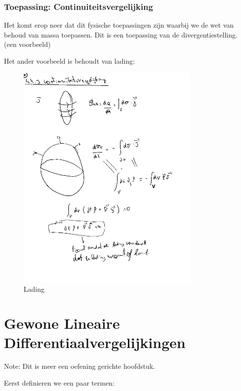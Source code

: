 \documentclass[a4paper]{report}
\begin{document}
\subsection{Toepassing: Continuiteitsvergelijking}

Het komt erop neer dat dit fysische toepassingen zijn waarbij we de wet van behoud van massa toepassen. Dit is een toepassing van de divergentiestelling. (een voorbeeld)

Het ander voorbeeld is behoudt van lading:

\begin{figure}[H]
	\centering
	\includegraphics[width=0.8\textwidth]{assets/lading.png}
	\caption{Lading}
	\label{fig:lading}
\end{figure}

\chapter{Gewone Lineaire Differentiaalvergelijkingen}

Note: Dit is meer een oefening gerichte hoofdstuk.

Eerst definieren we een paar termen:
\end{document}
